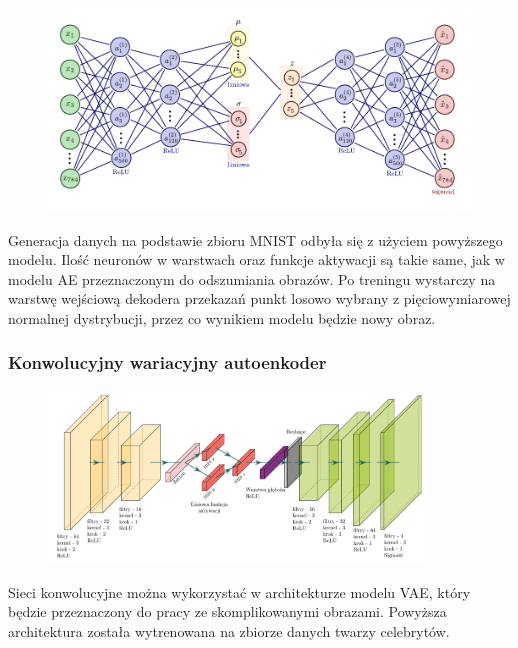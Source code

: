 \documentclass{beamer}
\begin{document}
	\begin{frame}
		\vspace{-1cm}
		\begin{figure}
			\centering\includegraphics[width=12cm]{prawdziwyvae.pdf}
		\end{figure}
	\vspace{-0.7cm}
	Generacja danych na podstawie zbioru MNIST odbyła się z użyciem powyższego modelu. Ilość neuronów w warstwach oraz funkcje aktywacji są takie same, jak w modelu AE przeznaczonym do odszumiania obrazów. Po treningu wystarczy na warstwę wejściową dekodera przekazań punkt losowo wybrany z pięciowymiarowej normalnej dystrybucji, przez co wynikiem modelu będzie nowy obraz.  
	\end{frame}
	\begin{frame}
		\frametitle{Konwolucyjny wariacyjny autoenkoder}
		\begin{figure}
			\centering\includegraphics[width=10cm]{my_arch.pdf}
		\end{figure}
	Sieci konwolucyjne można wykorzystać w architekturze modelu VAE, który będzie przeznaczony do pracy ze skomplikowanymi obrazami. Powyższa architektura została wytrenowana na zbiorze danych twarzy celebrytów.
	\end{frame}
\end{document}
